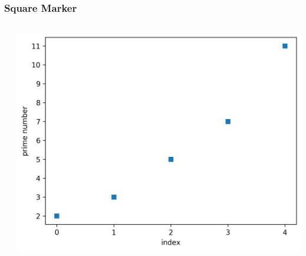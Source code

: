 \documentclass[xcolor={svgnames}]{beamer}
\newcommand{\pyfile}[2][]{}
\begin{document}
\begin{frame}[t,fragile]
    \frametitle{Square Marker}
    \vspace{5mm}
    \begin{columns}[T]
        \begin{column}{0.52\textwidth}
            \pyfile{examples/10-square-marker.py}
        \end{column}
        \begin{column}{0.48\textwidth}
            \includegraphics[width=\textwidth]{img/10-square-marker.png}
        \end{column}
    \end{columns}
\end{frame}
\end{document}
